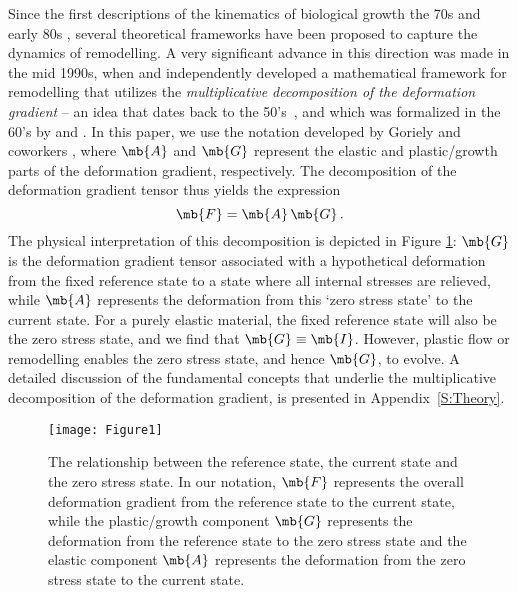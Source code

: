 Since the first descriptions of the kinematics of biological growth the 70s and early 80s \citep{Taber1995,Humphrey2003}, several theoretical frameworks have been proposed to capture the dynamics of remodelling. A very significant advance in this direction was made in the mid 1990s, when \citet{Rodriguez1994} and \citet{CookThesis} independently developed a mathematical framework for remodelling that utilizes the \textit{multiplicative decomposition of the deformation gradient} -- an idea that dates back to the 50's~\citep{Bilby1957,Kroner1958,Kroner1959}, and which was formalized in the 60's by \citet{Stojanovic1964,Stojanovic1970} and \citet{Lee1969}. In this paper, we use the notation developed by Goriely and coworkers \citep{Goriely2007,Goriely2008,Vandiver2009,Goriely2011}, where $\mb{A}$ and $\mb{G}$ represent the elastic and plastic/growth parts of the deformation gradient, respectively. The decomposition of the deformation gradient tensor thus yields the expression
\begin{equation}
\mb{F} = \mb{A} \, \mb{G} \,.
\label{MultDecomp}
\end{equation}
The physical interpretation of this decomposition is depicted in Figure \ref{F:ZSS}: $\mb{G}$ is the deformation gradient tensor associated with a hypothetical deformation from the fixed reference state to a state where all internal stresses are relieved, while $\mb{A}$ represents the deformation from this `zero stress state' to the current state. For a purely elastic material, the fixed reference state will also be the zero stress state, and we find that $\mb{G} \equiv \mb{I}$. However, plastic flow or remodelling enables the zero stress state, and hence $\mb{G}$, to evolve. A detailed discussion of the fundamental concepts that underlie the multiplicative decomposition of the deformation gradient, is presented in Appendix~\ref{S:Theory}.

\begin{figure}[t]
\begin{center}
\texttt{[image: Figure1]}
\caption{The relationship between the reference state, the current state and the zero stress state. In our notation, $\mb{F}$ represents the overall deformation gradient from the reference state to the current state, while the plastic/growth component $\mb{G}$ represents the deformation from the reference state to the zero stress state and the elastic component $\mb{A}$ represents the deformation from the zero stress state to the current state.
}\label{F:ZSS}
\end{center}
\end{figure}

